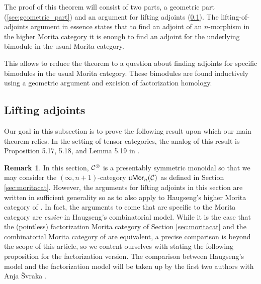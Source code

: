 \documentclass[10pt, reqno, twoside
, final
]{amsart}
\numberwithin{equation}{subsection}%
\theoremstyle{definition}
\theoremstyle{definition}
\theoremstyle{definition}
\theoremstyle{definition}
\theoremstyle{definition}
\theoremstyle{definition}
\theoremstyle{definition}
\theoremstyle{definition}
\theoremstyle{definition}
\theoremstyle{plain}
\theoremstyle{definition}
\theoremstyle{plain}
\theoremstyle{definition}
\theoremstyle{plain}
\theoremstyle{definition}
\newtheorem{rmk}[defn]{Remark}
\theoremstyle{definition}
\theoremstyle{plain}
\theoremstyle{plain}
\theoremstyle{definition}
\theoremstyle{plain}
\theoremstyle{plain}
\theoremstyle{plain}
\begin{document}
The proof of this theorem will consist of two parts, a geometric part (\ref{sec:geometric_part}) and an argument for lifting adjoints (\ref{sec:lifting_lemma}). 
The lifting-of-adjoints argument in essence states that to find an adjoint of an $n$-morphism in the higher Morita category it is enough to find an adjoint for the underlying bimodule in the usual Morita category.

This allows to reduce the theorem to a question about finding adjoints for specific bimodules in the usual Morita category. These bimodules are found inductively using a geometric argument and excision of factorization homology.



\subsection{Lifting adjoints}\label{sec:lifting_lemma}
Our goal in this subsection is to prove the following result upon which our main theorem relies. In the setting of tensor categories, the analog of this result is Proposition 5.17, 5.18, and Lemma 5.19 in \cite{BJS}.

\begin{rmk}
In this section, $\mathcal{C}^{\otimes}$ is a presentably symmetric monoidal \infcat so that we may consider the $(\infty,n+1)$-category $\mathfrak{u}\mathsf{Mor}_n(\mathcal{C})$ as defined in Section \ref{sec:moritacat}. However, the arguments for lifting adjoints in this section are written in sufficient generality so as to also apply to Haugseng's higher Morita category of \cite{HaugsengEn}. In fact, the arguments to come that are specific to the Morita category are \emph{easier} in Haugseng's combinatorial model. While it is the case that the (pointless) factorization Morita category of Section \ref{sec:moritacat} and the combinatorial Morita category of \cite{HaugsengEn} are equivalent, a precise comparison is beyond the scope of this article, so we content ourselves with stating the following proposition for the factorization version. The comparison between Haugseng's model and the factorization model will be taken up by the first two authors with Anja \v{S}vraka \cite{ScStSv}. 
\end{rmk}
\end{document}
